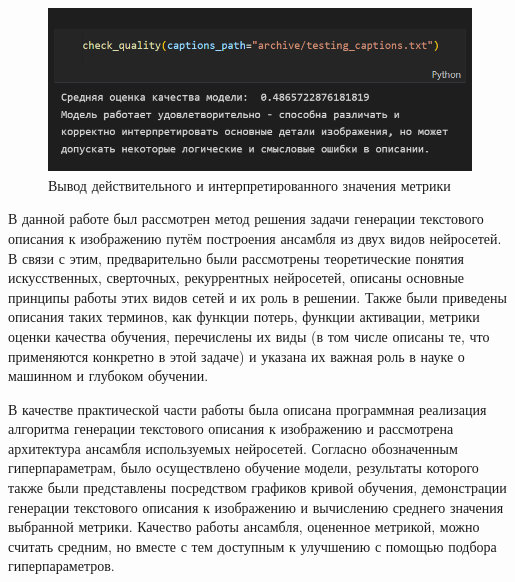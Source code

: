 \documentclass[bachelor, och, coursework]{SCWorks}
\begin{document}
        \begin{figure}[H]
            \centering
            \includegraphics[width=1\textwidth]{pics/metriceval.png}
            \caption{Вывод действительного и интерпретированного
                     значения метрики}
        \end{figure}

\conclusion

    В данной работе был рассмотрен метод решения задачи генерации текстового
    описания к изображению путём построения ансамбля из двух видов нейросетей. В
    связи с этим, предварительно были рассмотрены теоретические понятия
    искусственных, сверточных, рекуррентных нейросетей, описаны основные
    принципы работы этих видов сетей и их роль в решении. Также были приведены
    описания таких терминов, как функции потерь, функции активации, метрики
    оценки качества обучения, перечислены их виды (в том числе описаны те, что
    применяются конкретно в этой задаче) и указана их важная роль в науке о
    машинном и глубоком обучении.
    
    В качестве практической части работы была описана программная реализация
    алгоритма генерации текстового описания к изображению и рассмотрена
    архитектура ансамбля используемых нейросетей. Согласно обозначенным
    гиперпараметрам, было осуществлено обучение модели, результаты которого
    также были представлены посредством графиков кривой обучения, демонстрации
    генерации текстового описания к изображению и вычислению среднего значения
    выбранной метрики. Качество работы ансамбля, оцененное метрикой, можно
    считать средним, но вместе с тем доступным к улучшению с помощью подбора
    гиперпараметров.
\end{document}
